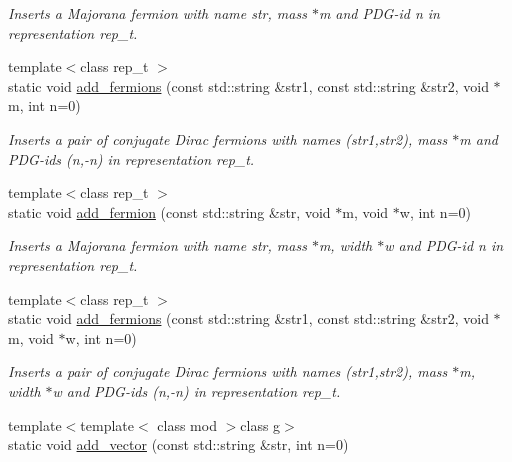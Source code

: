 \begin{DoxyCompactItemize}
\begin{DoxyCompactList}\small\item\em Inserts a Majorana fermion with name str, mass $\ast$m and P\-D\-G-\/id n in representation rep\-\_\-t. \end{DoxyCompactList}\item 
\hypertarget{a00370_a067a269d3fd0772630e716939bb85d74}{{\footnotesize template$<$class rep\-\_\-t $>$ }\\static void \hyperlink{a00370_a067a269d3fd0772630e716939bb85d74}{add\-\_\-fermions} (const std\-::string \&str1, const std\-::string \&str2, void $\ast$m, int n=0)}\label{a00370_a067a269d3fd0772630e716939bb85d74}

\begin{DoxyCompactList}\small\item\em Inserts a pair of conjugate Dirac fermions with names (str1,str2), mass $\ast$m and P\-D\-G-\/ids (n,-\/n) in representation rep\-\_\-t. \end{DoxyCompactList}\item 
\hypertarget{a00370_ad7f5ce640caf371a0acafe100f138de4}{{\footnotesize template$<$class rep\-\_\-t $>$ }\\static void \hyperlink{a00370_ad7f5ce640caf371a0acafe100f138de4}{add\-\_\-fermion} (const std\-::string \&str, void $\ast$m, void $\ast$w, int n=0)}\label{a00370_ad7f5ce640caf371a0acafe100f138de4}

\begin{DoxyCompactList}\small\item\em Inserts a Majorana fermion with name str, mass $\ast$m, width $\ast$w and P\-D\-G-\/id n in representation rep\-\_\-t. \end{DoxyCompactList}\item 
\hypertarget{a00370_a91b3e991cb82636afd1e55f43f627cad}{{\footnotesize template$<$class rep\-\_\-t $>$ }\\static void \hyperlink{a00370_a91b3e991cb82636afd1e55f43f627cad}{add\-\_\-fermions} (const std\-::string \&str1, const std\-::string \&str2, void $\ast$m, void $\ast$w, int n=0)}\label{a00370_a91b3e991cb82636afd1e55f43f627cad}

\begin{DoxyCompactList}\small\item\em Inserts a pair of conjugate Dirac fermions with names (str1,str2), mass $\ast$m, width $\ast$w and P\-D\-G-\/ids (n,-\/n) in representation rep\-\_\-t. \end{DoxyCompactList}\item 
\hypertarget{a00370_a0284fb404903e3ebb75dbaa7e337b3ff}{{\footnotesize template$<$template$<$ class mod $>$class g$>$ }\\static void \hyperlink{a00370_a0284fb404903e3ebb75dbaa7e337b3ff}{add\-\_\-vector} (const std\-::string \&str, int n=0)}\label{a00370_a0284fb404903e3ebb75dbaa7e337b3ff}


\end{DoxyCompactItemize}
